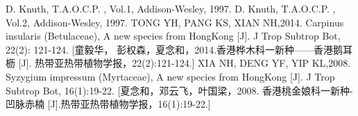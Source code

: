 \documentclass[utf8, hyperref]{book}
\begin{document}
\begin{thebibliography}{参考文献}
 D. Knuth, T.A.O.C.P. , Vol.1, Addison-Wesley, 1997.
 D. Knuth, T.A.O.C.P. , Vol.2, Addison-Wesley, 1997.
 TONG YH, PANG KS, XIAN NH,2014. Carpinus insularis (Betulaceae), A new species from HongKong [J]. J Trop Subtrop Bot, 22(2): 121-124. [童毅华， 彭权森，夏念和，2014.香港桦木科一新种——香港鹅耳枥 [J]. 热带亚热带植物学报，22(2):121-124.]
 XIA NH, DENG YF, YIP KL,2008. Syzygium impressum (Myrtaceae), A new species from HongKong [J]. J Trop Subtrop Bot, 16(1):19-22. [夏念和，邓云飞，叶国梁，2008. 香港桃金娘科一新种-凹脉赤楠 [J].热带亚热带植物学报，16(1):19-22.]
\end{thebibliography}


\end{document}
